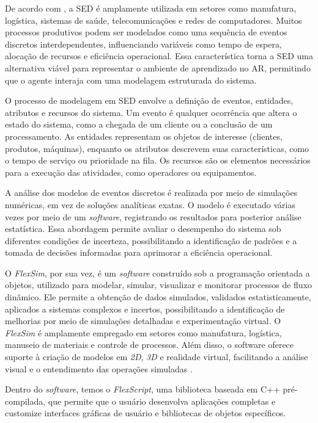 \documentclass[
    12pt,                %
    openright,           %
    oneside,             %
    a4paper,             %
    english,             %
    spanish,             %
    brazil               %
]{ufscar}
\begin{document}
De acordo com , a SED é amplamente utilizada em setores como manufatura, logística, sistemas de saúde, telecomunicações e redes de computadores. Muitos processos produtivos podem ser modelados como uma sequência de eventos discretos interdependentes, influenciando variáveis como tempo de espera, alocação de recursos e eficiência operacional. Essa característica torna a SED uma alternativa viável para representar o ambiente de aprendizado no AR, permitindo que o agente interaja com uma modelagem estruturada do sistema.

O processo de modelagem em SED envolve a definição de eventos, entidades, atributos e recursos do sistema. Um evento é qualquer ocorrência que altera o estado do sistema, como a chegada de um cliente ou a conclusão de um processamento. As entidades representam os objetos de interesse (clientes, produtos, máquinas), enquanto os atributos descrevem suas características, como o tempo de serviço ou prioridade na fila. Os recursos são os elementos necessários para a execução das atividades, como operadores ou equipamentos.

A análise dos modelos de eventos discretos é realizada por meio de simulações numéricas, em vez de soluções analíticas exatas. O modelo é executado várias vezes por meio de um \textit{software}, registrando os resultados para posterior análise estatística. Essa abordagem permite avaliar o desempenho do sistema sob diferentes condições de incerteza, possibilitando a identificação de padrões e a tomada de decisões informadas para aprimorar a eficiência operacional.

O \textit{FlexSim}, por sua vez, é um \textit{software} construído sob a programação orientada a objetos, utilizado para modelar, simular, visualizar e monitorar processos de fluxo dinâmico. Ele permite a obtenção de dados simulados, validados estatisticamente, aplicados a sistemas complexos e incertos, possibilitando a identificação de melhorias por meio de simulações detalhadas e experimentação virtual. O \textit{FlexSim} é amplamente empregado em setores como manufatura, logística, manuseio de materiais e controle de processos. Além disso, o software oferece suporte à criação de modelos em \textit{2D}, \textit{3D} e realidade virtual, facilitando a análise visual e o entendimento das operações simuladas \cite{nordgren_flexsim_2003}.

Dentro do \textit{software}, temos o \textit{FlexScript}, uma biblioteca baseada em C++ pré-compilada, que permite que o usuário desenvolva aplicações completas e customize interfaces gráficas de usuário e bibliotecas de objetos específicos.
\end{document}
